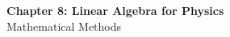 \documentclass[12pt]{article}
\begin{document}
\begin{center}
  {\LARGE\bfseries Chapter 8: Linear Algebra for Physics}\\[0.25em]
  {\large Mathematical Methods}\\[0.15em]
\end{center}

\end{document}

